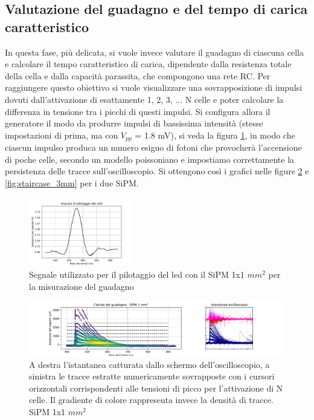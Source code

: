 \documentclass[journal]{IEEEtran}
\begin{document}
\subsection{Valutazione del guadagno e del tempo di carica caratteristico}
In questa fase, più delicata, si vuole invece valutare il guadagno di ciascuna cella e calcolare il tempo caratteristico di carica, dipendente dalla resistenza totale della cella e dalla capacità parassita, che compongono una rete RC. Per raggiungere questo obiettivo si vuole visualizzare una sovrapposizione di impulsi dovuti dall'attivazione di esattamente 1, 2, 3, ... N celle e poter calcolare la differenza in tensione tra i picchi di questi impulsi. Si configura allora il generatore il modo da produrre impulsi di bassissima intensità (stesse impostazioni di prima, ma con $V_{pp}$ = 1.8 mV), si veda la figura \ref{fig:ledp}, in modo che ciascun impulso produca un numero esiguo di fotoni che provocherà l'accensione di poche celle, secondo un modello poissoniano e impostiamo correttamente la persistenza delle tracce sull'oscilloscopio. Si ottengono così i grafici nelle figure \ref{fig:staircase_1mm} e \ref{fig:staircase_3mm} per i due SiPM. 

\begin{figure}[H]%
\begin{center}
\includegraphics[width=0.40\textwidth]{analysis/output/SiPM_ledp.pdf}
\caption{Segnale utilizzato per il pilotaggio del led con il SiPM 1x1 $mm^2$ per la misurazione del guadagno}
\label{fig:ledp}
\end{center}
\end{figure}

\begin{figure}[t]%
\centering
\begin{center}
\includegraphics[trim = {100pt 0 0 0}, width=1.15\textwidth]{analysis/output/SiPM_1mm_gain_staircase.pdf}
\end{center}
\caption{A destra l'istantanea catturata dallo schermo dell'oscilloscopio, a sinistra le tracce estratte numericamente sovrapposte con i cursori orizzontali corrispondenti alle tensioni di picco per l'attivazione di N celle. Il gradiente di colore rappresenta invece la densità di tracce. SiPM 1x1 $mm^2$}
\label{fig:staircase_1mm}
\end{figure}
\end{document}
